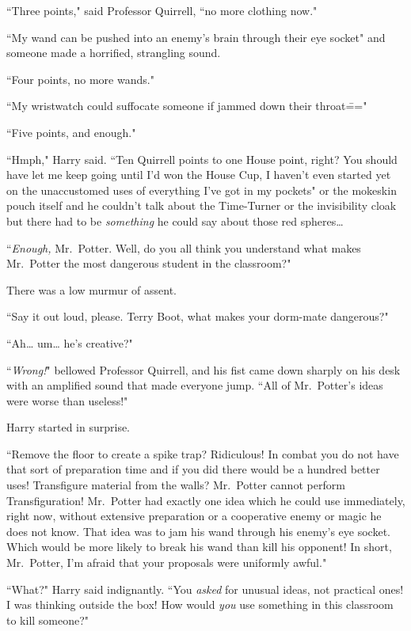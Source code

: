 ``Three points," said Professor Quirrell, ``no more clothing now."

``My wand can be pushed into an enemy's brain through their eye socket" and someone made a horrified, strangling sound.

``Four points, no more wands."

``My wristwatch could suffocate someone if jammed down their throat\==="

``Five points, and enough."

``Hmph," Harry said. ``Ten Quirrell points to one House point, right? You should have let me keep going until I'd won the House Cup, I haven't even started yet on the unaccustomed uses of everything I've got in my pockets" or the mokeskin pouch itself and he couldn't talk about the Time-Turner or the invisibility cloak but there had to be \emph{something} he could say about those red spheres{\ldots}

``\emph{Enough,} Mr.~Potter. Well, do you all think you understand what makes Mr.~Potter the most dangerous student in the classroom?"

There was a low murmur of assent.

``Say it out loud, please. Terry Boot, what makes your dorm-mate dangerous?"

``Ah{\ldots} um{\ldots} he's creative?"

``\emph{Wrong!}" bellowed Professor Quirrell, and his fist came down sharply on his desk with an amplified sound that made everyone jump. ``All of Mr.~Potter's ideas were worse than useless!"

Harry started in surprise.

``Remove the floor to create a spike trap? Ridiculous! In combat you do not have that sort of preparation time and if you did there would be a hundred better uses! Transfigure material from the walls? Mr.~Potter cannot perform Transfiguration! Mr.~Potter had exactly one idea which he could use immediately, right now, without extensive preparation or a cooperative enemy or magic he does not know. That idea was to jam his wand through his enemy's eye socket. Which would be more likely to break his wand than kill his opponent! In short, Mr.~Potter, I'm afraid that your proposals were uniformly awful."

``What?" Harry said indignantly. ``You \emph{asked} for unusual ideas, not practical ones! I was thinking outside the box! How would \emph{you} use something in this classroom to kill someone?"

